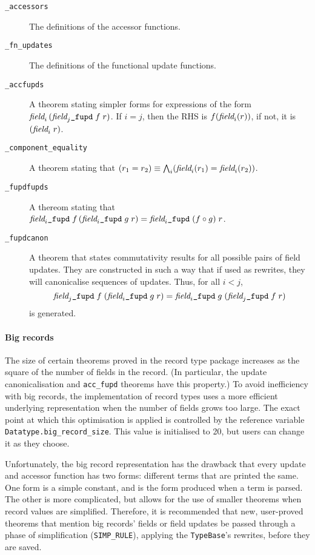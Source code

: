 \begin{description}
\item[\texttt{\_accessors}] The definitions of the accessor functions.
  \rewruse
\item[\texttt{\_fn\_updates}] The definitions of the functional update
  functions.
\item[\texttt{\_accfupds}] A theorem stating simpler forms for
  expressions of the form $\mbox{\it field}_{i}\, (\mbox{\it field}_{j}\mbox{\tt\_fupd}\;f\; r)$.  If
  $i = j$, then the RHS is $f (\mbox{\it field}_{i}(r))$, if not, it is $(\mbox{\it field}_{i}\;r)$.
  \rewruse
\item[\texttt{\_component\_equality}] A theorem stating that $(r_1 =
  r_2) \equiv \bigwedge_i (\mbox{\it field}_{i}(r_1) = \mbox{\it field}_{i}(r_2))$.
\item[\texttt{\_fupdfupds}] A thereom stating that $\mbox{\it field}_{i}\mbox{\tt\_fupd}
  \;f \,(\mbox{\it field}_{i}\mbox{\tt\_fupd} \;g\;r) = \mbox{\it field}_{i}\mbox{\tt\_fupd}\;(f \circ g)\;r$.
  \rewruse
\item[\texttt{\_fupdcanon}] A theorem that states commutativity results
  for all possible pairs of field updates.  They are constructed in
  such a way that if used as rewrites, they will canonicalise
  sequences of updates. Thus, for all $i < j$, \[
  \mbox{\it field}_{j}\mbox{\tt\_fupd}\;f\;(\mbox{\it field}_{i}\mbox{\tt\_fupd}\;g\;r) =
  \mbox{\it field}_{i}\mbox{\tt\_fupd}\;g\;(\mbox{\it field}_{j}\mbox{\tt\_fupd}\;f\;r)
  \] is generated.
 \rewruse
\end{description}

\paragraph{Big records} The size of certain theorems proved in the
record type package increases as the square of the number of fields in
the record.  (In particular, the update canonicalisation and
\texttt{acc\_fupd} theorems have this property.) To avoid inefficiency
with big records, the implementation of record types uses a more
efficient underlying representation when the number of fields grows
too large.  The exact point at which this optimisation is applied is
controlled by the reference variable
\texttt{Datatype.big\_record\_size}.  This value is initialised to 20,
but users can change it as they choose.

Unfortunately, the big record representation has the drawback that
every update and accessor function has two forms: different terms that
are printed the same.  One form is a simple constant, and is the form
produced when a term is parsed.  The other is more complicated, but
allows for the use of smaller theorems when record values are
simplified.  Therefore, it is recommended that new, user-proved
theorems that mention big records' fields or field updates be passed
through a phase of simplification (\texttt{SIMP\_RULE}), applying the
\texttt{TypeBase}'s rewrites, before they are saved.

